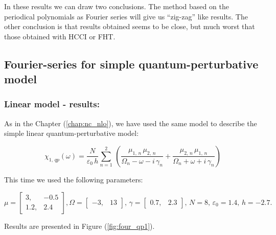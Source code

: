 \documentclass[12pt,twoside,a4paper]{article}
\numberwithin{equation}{subsection}
\numberwithin{figure}{subsection}
\begin{document}
In these results we can draw two conclusions. The method based on the periodical polynomials as Fourier series will give us ``zig-zag'' like results. The other conclusion is that results obtained seems to be close, but much worst that those obtained with HCCI or FHT. 

\subsection{Fourier-series for simple quantum-perturbative model} \label{chap:fourier_quantum}

\subsubsection*{Linear model - results:}

As in the Chapter (\ref{chap:nc_nlo}), we have used the same model to describe the simple linear quantum-perturbative model: 

\begin{equation} \label{eq:four_qp}
  \chi_{1, \,qp} (\omega ) = \frac {N}{\varepsilon_0 \, h} \sum_{n=1}^{2} \, 
  	\left(
  		\frac {\mu_{1, \,n} \, \mu_{2, \, n}}{\Omega_n - \omega - i \, \gamma_n} 
  	  + \frac {\mu_{2, \,n} \, \mu_{1, \, n}}{\Omega_n + \omega + i \, \gamma_n}
	\right)
\end{equation}

This time we used the following parameters: 

\begin{equation}
  \mu = \begin{bmatrix} 
    3,   & - 0.5 \\ 
    1.2, &   2.4
  \end{bmatrix},
  \Omega = \begin{bmatrix} 
    - 3, & 13
  \end{bmatrix}, \,
  \gamma = \begin{bmatrix} 
    0.7, & 2.3
  \end{bmatrix}, \,
  N = 8, \,
  \varepsilon_{0} = 1.4, \,
  h = - 2.7.
\end{equation} 

Results are presented in Figure (\ref{fig:four_qp1}). 
\end{document}
